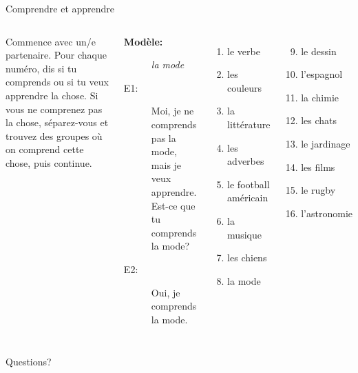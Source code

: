 \documentclass{beamer}
\begin{document}
  \begin{frame}{Comprendre et apprendre}
    \begin{columns}[t]
        {\small
        Commence avec un/e partenaire.
        Pour chaque numéro, dis si tu \alert{comprends} ou si tu veux \alert{apprendre} la chose.
        Si vous ne comprenez pas la chose, séparez-vous et trouvez des groupes où on comprend cette chose, puis continue.} \\
        \scriptsize
        \begin{description}
          \item[\textbf{Modèle:}] \emph{la mode}
          \item[E1:] Moi, je ne comprends pas la mode, mais je veux apprendre. Est-ce que tu comprends la mode?
          \item[E2:] Oui, je comprends la mode.
        \end{description}
        \begin{columns}[t]
            \begin{enumerate}
              \item le verbe 
              \item les couleurs
              \item la littérature
              \item les adverbes
              \item le football américain
              \item la musique
              \item les chiens
              \item la mode
            \end{enumerate}
            \begin{enumerate}
              \setcounter{enumi}{8}
              \item le dessin
              \item l'espagnol
              \item la chimie
              \item les chats
              \item le jardinage
              \item les films
              \item le rugby
              \item l'astronomie
            \end{enumerate}
        \end{columns}
    \end{columns}
  \end{frame}

  \begin{frame}{}
    \begin{center}
      \Large Questions?
    \end{center}
  \end{frame}
\end{document}
